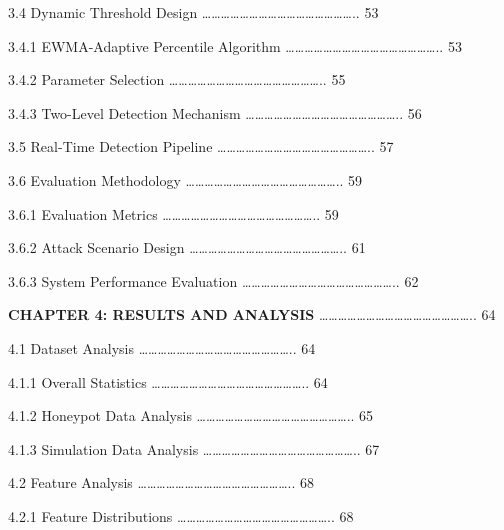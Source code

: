 \documentclass[
  a4paper]{report}
\begin{document}
3.4 Dynamic Threshold Design
\ldots\ldots\ldots\ldots\ldots\ldots\ldots\ldots\ldots\ldots\ldots\ldots\ldots\ldots\ldots\ldots..
53

3.4.1 EWMA-Adaptive Percentile Algorithm
\ldots\ldots\ldots\ldots\ldots\ldots\ldots\ldots\ldots\ldots\ldots\ldots\ldots\ldots\ldots\ldots..
53

3.4.2 Parameter Selection
\ldots\ldots\ldots\ldots\ldots\ldots\ldots\ldots\ldots\ldots\ldots\ldots\ldots\ldots\ldots\ldots..
55

3.4.3 Two-Level Detection Mechanism
\ldots\ldots\ldots\ldots\ldots\ldots\ldots\ldots\ldots\ldots\ldots\ldots\ldots\ldots\ldots\ldots..
56

3.5 Real-Time Detection Pipeline
\ldots\ldots\ldots\ldots\ldots\ldots\ldots\ldots\ldots\ldots\ldots\ldots\ldots\ldots\ldots\ldots..
57

3.6 Evaluation Methodology
\ldots\ldots\ldots\ldots\ldots\ldots\ldots\ldots\ldots\ldots\ldots\ldots\ldots\ldots\ldots\ldots..
59

3.6.1 Evaluation Metrics
\ldots\ldots\ldots\ldots\ldots\ldots\ldots\ldots\ldots\ldots\ldots\ldots\ldots\ldots\ldots\ldots..
59

3.6.2 Attack Scenario Design
\ldots\ldots\ldots\ldots\ldots\ldots\ldots\ldots\ldots\ldots\ldots\ldots\ldots\ldots\ldots\ldots..
61

3.6.3 System Performance Evaluation
\ldots\ldots\ldots\ldots\ldots\ldots\ldots\ldots\ldots\ldots\ldots\ldots\ldots\ldots\ldots\ldots..
62

\textbf{CHAPTER 4: RESULTS AND ANALYSIS}
\ldots\ldots\ldots\ldots\ldots\ldots\ldots\ldots\ldots\ldots\ldots\ldots\ldots\ldots\ldots\ldots..
64

4.1 Dataset Analysis
\ldots\ldots\ldots\ldots\ldots\ldots\ldots\ldots\ldots\ldots\ldots\ldots\ldots\ldots\ldots\ldots..
64

4.1.1 Overall Statistics
\ldots\ldots\ldots\ldots\ldots\ldots\ldots\ldots\ldots\ldots\ldots\ldots\ldots\ldots\ldots\ldots..
64

4.1.2 Honeypot Data Analysis
\ldots\ldots\ldots\ldots\ldots\ldots\ldots\ldots\ldots\ldots\ldots\ldots\ldots\ldots\ldots\ldots..
65

4.1.3 Simulation Data Analysis
\ldots\ldots\ldots\ldots\ldots\ldots\ldots\ldots\ldots\ldots\ldots\ldots\ldots\ldots\ldots\ldots..
67

4.2 Feature Analysis
\ldots\ldots\ldots\ldots\ldots\ldots\ldots\ldots\ldots\ldots\ldots\ldots\ldots\ldots\ldots\ldots..
68

4.2.1 Feature Distributions
\ldots\ldots\ldots\ldots\ldots\ldots\ldots\ldots\ldots\ldots\ldots\ldots\ldots\ldots\ldots\ldots..
68
\end{document}
